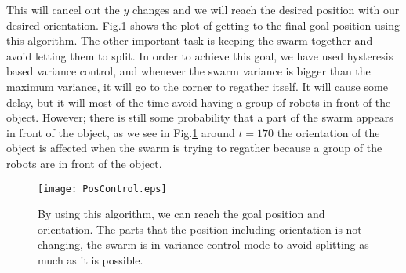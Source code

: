 This will cancel out the $y$ changes and we will reach the desired position with our desired orientation. Fig.\ref{fig:PosControlFig} shows the plot of getting to the final goal position using this algorithm. The other important task is keeping the swarm together and avoid letting them to split. In order to achieve this goal, we have used hysteresis based variance control, and whenever the swarm variance is bigger than the maximum variance, it will go to the corner to regather itself. It will cause some delay, but it will most of the time avoid having a group of robots in front of the object. However; there is still some probability that a part of the swarm appears in front of the object, as we see in Fig.\ref{fig:PosControlFig} around $t=170$ the orientation of the object is affected when the swarm is trying to regather because a group of the robots are in front of the object. 

\begin{figure}
\begin{center}
	\texttt{[image: PosControl.eps]}
\end{center}
\vspace{-2em}
\caption{\label{fig:PosControlFig}
By using this algorithm, we can reach the goal position and orientation. The parts that the position including orientation is not changing, the swarm is in variance control mode to avoid splitting as much as it is possible. 
}
\vspace{-1em}
\end{figure}


